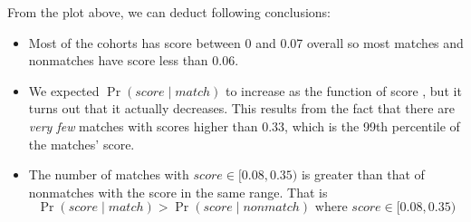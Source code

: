From the plot above, we can deduct following conclusions:
\begin{itemize}
\item Most of the cohorts has score between 0 and 0.07 overall so most matches 
and nonmatches have score less than 0.06.
\item We expected $\Pr{(score \mid match)}$ to increase as the function of score
, but it turns out that it actually decreases. This results from the fact that 
there are \emph{very few} matches with scores higher than 0.33, which is the 99th
percentile of the matches' score.
\item The number of matches with $score \in [0.08, 0.35)$ is greater than that of
nonmatches with the score in the same range. That is 
$$\Pr{(score \mid match)} > \Pr{(score \mid nonmatch)} \mbox{ where } score\in [0.08, 0.35)$$
\end{itemize}

